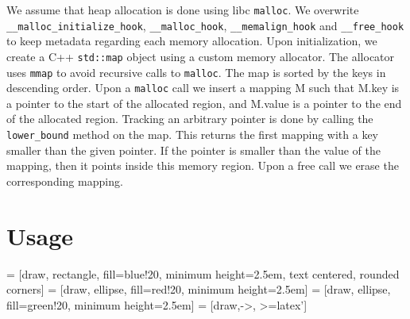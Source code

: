 \documentclass{article}
\begin{document}
We assume that heap allocation is done using libc \texttt{malloc}. We overwrite \texttt{\_\_malloc\_initialize\_hook}, \texttt{\_\_malloc\_hook}, \texttt{\_\_memalign\_hook} and \texttt{\_\_free\_hook} to keep metadata regarding each memory allocation. Upon initialization, we create a C++ \texttt{std::map} object using a custom memory allocator. The allocator uses \texttt{mmap} to avoid recursive calls to \texttt{malloc}. The map is sorted by the keys in descending order. Upon a \texttt{malloc} call we insert a mapping M such that M.key is a pointer to the start of the allocated region, and M.value is a pointer to the end of the allocated region. Tracking an arbitrary pointer is done by calling the \texttt{lower\_bound} method on the map. This returns the first mapping with a key smaller than the given pointer. If the pointer is smaller than the value of the mapping, then it points inside this memory region. Upon a free call we erase the corresponding mapping.

\section*{Usage}

    = [draw, rectangle, fill=blue!20,   minimum height=2.5em, text centered, rounded corners]
 = [draw, ellipse,   fill=red!20,    minimum height=2.5em]
 = [draw, ellipse,   fill=green!20,  minimum height=2.5em]
    = [draw,->, >=latex']

\end{document}
